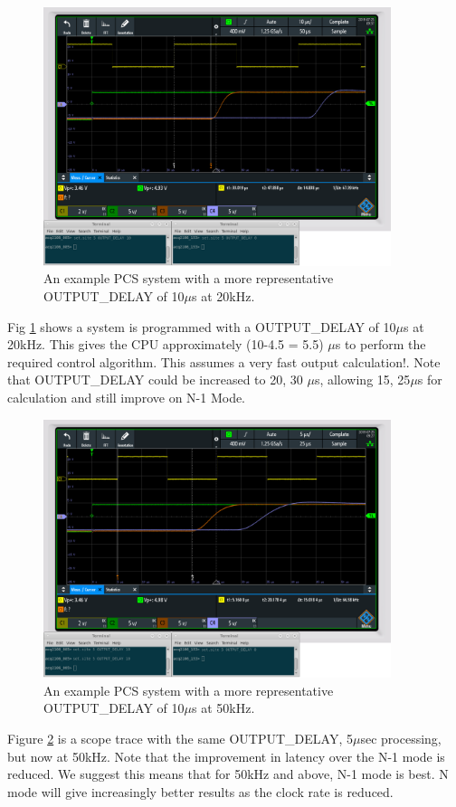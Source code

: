 \documentclass{article}
\begin{document}
\begin{figure}
	\centering
	\includegraphics[width=4.0in]{images/n-mode-pcs-scope-trace-20kHz-2.png}
	\caption{An example PCS system with a more representative OUTPUT\_DELAY of 10$\mu$s at 20kHz.}
	\label{20repscope}
\end{figure}

Fig \ref{20repscope} shows a system is programmed with a OUTPUT\_DELAY of 10$\mu$s at 20kHz.
This gives the CPU approximately (10-4.5 = 5.5) $\mu$s to perform the required control algorithm.
This assumes a very fast output calculation!.
Note that OUTPUT\_DELAY could be increased to 20, 30 $\mu$s, allowing 15, 25$\mu$s for calculation and still improve on N-1 Mode.


\begin{figure}
	\centering
	\includegraphics[width=4.0in]{images/n-mode-pcs-scope-trace-50kHz-2.png}
	\caption{An example PCS system with a more representative OUTPUT\_DELAY of 10$\mu$s at 50kHz.}
	\label{50repscope}
\end{figure}

Figure \ref{50repscope} is a scope trace with the same OUTPUT\_DELAY, 5$\mu$sec processing, but now at 50kHz.
Note that the improvement in latency over the N-1 mode is reduced.
We suggest this means that for 50kHz and above, N-1 mode is best.
N mode will give increasingly better results as the clock rate is reduced.
\end{document}
